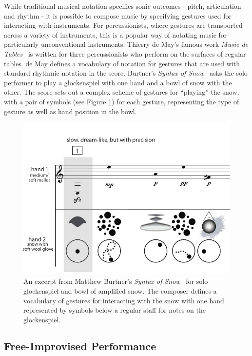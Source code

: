\documentclass[graybox]{svmult}
\begin{document}
While traditional musical notation specifies sonic outcomes - pitch,
articulation and rhythm - it is possible to compose music by
specifying gestures used for interacting with instruments. For
percussionists, where gestures are transported across a variety of
instruments, this is a popular way of notating music for particularly
unconventional instruments. Thierry de May's famous work \emph{Music
de Tables}~\cite{May:1987fk} is written for three percussionists who
perform on the surfaces of regular tables. de May defines a vocabulary
of notation for gestures that are used with standard rhythmic notation
in the score. Burtner's \emph{Syntax of Snow}~\cite{Burtner:2011fk}
asks the solo performer to play a glockenspiel with one hand and a
bowl of snow with the other. The score sets out a complex scheme of
gestures for ``playing'' the snow, with a pair of symbols (see Figure
\ref{fig:SyntaxOfSnow}) for each gesture, representing the type of
gesture as well as hand position in the bowl.

\begin{figure}[h] \centering
\includegraphics[width=0.7\columnwidth]{figures/syntaxofsnow-excerpt.jpg}
\caption{An excerpt from Matthew Burtner's \emph{Syntax of
    Snow}~\cite{Burtner:2011fk} for solo glockenspiel and bowl of
  amplified snow. The composer defines a vocabulary of
  gestures for interacting with the snow with one hand represented by
  symbols below a regular staff for notes on the glockenspiel.}
\label{fig:SyntaxOfSnow}
\end{figure}

\subsection{Free-Improvised Performance}
\end{document}
